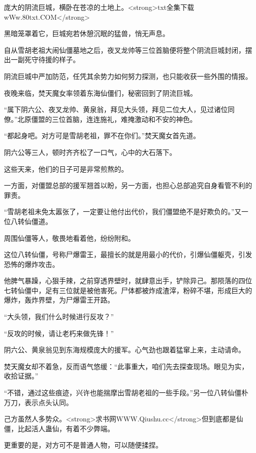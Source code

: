 
\begin{this_body}

庞大的阴流巨城，横卧在苍凉的土地上。<strong>txt全集下载wWw.80txt.COM</strong>

黑暗笼罩着它，巨城宛若休憩沉眠的猛兽，悄无声息。

自从雪胡老祖大闹仙僵墓地之后，夜叉龙帅等三位首脑便将整个阴流巨城封闭，摆出一副死守待援的样子。

阴流巨城中严加防范，任凭其余势力如何努力探测，也只能收获一些外围的情报。

夜晚来临，焚天魔女率领着东海仙僵们，秘密回到了阴流巨城。

“属下阴六公、夜叉龙帅、黄泉翁，拜见大头领，拜见二位大人，见过诸位同僚。”北原僵盟的三位首脑，连连施礼，难掩激动和不安的神色。

“都起身吧。对方可是雪胡老祖，罪不在你们。”焚天魔女首先道。

阴六公等三人，顿时齐齐松了一口气，心中的大石落下。

这些天来，他们的日子可是非常煎熬的。

一方面，对僵盟总部的援军翘首以盼，另一方面，也担心总部追究自身看管不利的罪责。

“雪胡老祖未免太嚣张了，一定要让他付出代价，我们僵盟绝不是好欺负的。”又一位八转仙僵道。

周围仙僵等人，敬畏地看着他，纷纷附和。

这位八转仙僵，号称尸爆雷王，最擅长的就是用最小的代价，引爆仙僵躯壳，引发恐怖的爆炸攻击。

他脾气暴躁，心狠手辣，之前穿透界壁时，就肆意出手，铲除异己。那陨落的四位七转仙僵中，足有三位就是被他害死。尸体都被炸成渣滓，粉碎不堪，形成巨大的爆炸，轰炸界壁，为尸爆雷王开路。

“大头领，我们什么时候进行反攻？”

“反攻的时候，请让老朽来做先锋！”

阴六公、黄泉翁见到东海规模庞大的援军。心气劲也跟着猛窜上来，主动请命。

焚天魔女却不着急，反而语气悠缓：“此事重大，咱们先去探查现场。眼见为实，收拾证据。”

“不错，通过这些痕迹，兴许也能揣摩出雪胡老祖的一些手段。”另一位八转仙僵朴万刀，表示点头认同。

己方虽然人多势众。<strong>求书网WWW.Qiushu.cc</strong>但到底都是仙僵，比起活人蛊仙，有着不少弊端。

更重要的是，对方可不是普通人物，可以随便揉捏。


\end{this_body}
